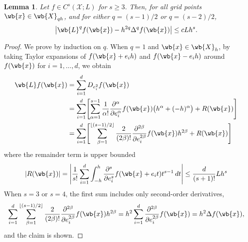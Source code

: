 \documentclass{article}
\newcommand{\abs}[1]{\left \lvert #1 \right \rvert}
\newcommand{\floor}[1]{\left\lfloor #1 \right\rfloor}
\newcommand{\1}{\mathbf{1}}
\newcommand{\Xset}{\mathcal{X}}
\theoremstyle{alden}
\theoremstyle{aldenthm}
\newtheorem{lemma}{Lemma}
\theoremstyle{definition}
\theoremstyle{remark}
\begin{document}
\begin{lemma}
	\label{lem:grid_laplacian_approximation_error}
	Let $f \in C^s(\Xset;L)$ for $s \geq 3$. Then, for all grid points $\wb{x} \in \wb{X}_{qh}$, and for either $q = (s - 1)/2$ or $q = (s - 2)/2$,
	\begin{equation*}
	\abs{\wb{L}^{q}f(\wb{x}) - h^{2q}\Delta^{q}f(\wb{x})} \leq cLh^s.
	\end{equation*}
\end{lemma}
\begin{proof}
	We prove by induction on $q$. When $q = 1$ and $\wb{x} \in \wb{X}_{h}$, by taking Taylor expansions of $f(\wb{x} + e_ih)$ and $f(\wb{x} - e_ih)$ around $f(\wb{x})$ for $i = 1,\ldots,d$, we obtain
	\begin{align}
	\wb{L}f(\wb{x}) & = \sum_{i = 1}^{d} D_{e_i^2}f(\wb{x}) \nonumber \\
	& = \sum_{i = 1}^{d} \Biggl[\sum_{\alpha = 1}^{s - 1}\frac{1}{\alpha!}\frac{\partial^{\alpha}}{\partial e_i^{\alpha}} f(\wb{x})\bigl(h^{\alpha} + (-h)^{\alpha}\bigr) + R(\wb{x}) \Biggr] \nonumber \\
	& = \sum_{i = 1}^{d} \Biggl[\sum_{\beta = 1}^{\floor{(s - 1)/2}}\frac{2}{(2\beta)!}\frac{\partial^{2\beta}}{\partial e_i^{2\beta}} f(\wb{x}) h^{2\beta} + R(\wb{x})\Biggr] \label{eqn:grid_laplacian_approximation_error_pf1}
	\end{align} 
	where the remainder term is upper bounded
	\begin{equation*}
	\abs{R(\wb{x})} = \abs{\frac{1}{s!}\sum_{i = 1}^d \int_{-h}^{h} \frac{\partial^s}{\partial e_i^s} f(\wb{x} + e_it) t^{s - 1} \,dt} \leq \frac{d}{(s + 1)!} L h^s 
	\end{equation*}
	When $s = 3$ or $s = 4$, the first sum includes only second-order derivatives,
	\begin{equation*}
	\sum_{i = 1}^{d} \sum_{\beta = 1}^{\floor{(s - 1)/2}}\frac{2}{(2\beta)!}\frac{\partial^{2\beta}}{\partial e_i^{2\beta}} f(\wb{x}) h^{2\beta} = h^2 \sum_{i = 1}^d \frac{\partial^{2\beta}}{\partial e_i^{2\beta}} f(\wb{x}) = h^2 \Delta f(\wb{x}),
	\end{equation*}
	and the claim is shown.
	

\end{proof}
\end{document}
